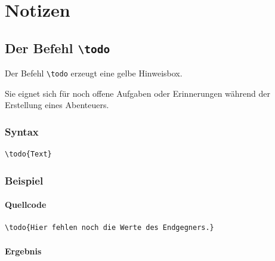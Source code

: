 \section{Notizen}

\subsection{Der Befehl \texttt{\textbackslash todo}}

Der Befehl \verb|\todo| erzeugt eine gelbe Hinweisbox.

Sie eignet sich für noch offene Aufgaben oder Erinnerungen während der Erstellung eines Abenteuers.

\subsubsection*{Syntax}

\begin{Verbatim}
\todo{Text}
\end{Verbatim}

\subsubsection*{Beispiel}

\paragraph{Quellcode}

\begin{Verbatim}
\todo{Hier fehlen noch die Werte des Endgegners.}
\end{Verbatim}

\paragraph{Ergebnis}

